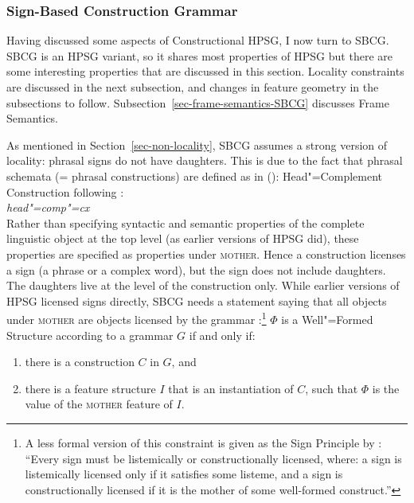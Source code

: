 \documentclass[output=paper,biblatex,babelshorthands,newtxmath,draftmode,colorlinks,citecolor=brown]{langscibook}
\begin{document}
\subsubsection{Sign-Based Construction Grammar}
\label{cxg:sec-sbcg}\label{sec-sbcg}

Having discussed some aspects of Constructional HPSG, I now turn to SBCG. SBCG is an HPSG variant,
so it shares most properties of HPSG but there are some interesting properties that are discussed in
this section. Locality constraints are discussed in the next subsection, and changes in feature geometry
in the subsections to follow. Subsection~\ref{sec-frame-semantics-SBCG} discusses Frame Semantics.

\label{sec-locality}

As mentioned in Section~\ref{sec-non-locality}, SBCG assumes a strong version of locality: phrasal
signs do not have daughters. This is due to the fact that phrasal schemata (= phrasal constructions)
are defined as in ():
\eas
Head"=Complement Construction following \citet[481]{SWB2003a}:\\
\emph{head"=comp"=cx} \impl\\
\zs
Rather than specifying syntactic and semantic properties of the complete linguistic object at the
top level (as earlier versions of HPSG did), these properties are specified as properties under \textsc{mother}. Hence a construction
licenses a sign (a phrase or a complex word), but the sign does not include daughters. The daughters live at the level of the
construction only. While earlier versions of HPSG licensed signs directly, SBCG needs a statement
saying that all objects under \textsc{mother} are objects licensed by the grammar \citep*[]{SWB2003a}:\footnote{%
A less formal version of this constraint is given as the Sign Principle by
\citet[]{Sag2012a}: ``Every sign must be listemically or constructionally licensed, where: a
sign is listemically licensed only if it satisfies some listeme, and a sign is constructionally
licensed if it is the mother of some well-formed construct.''
}
\ea
\label{meta-construction-statemnet}
$\Phi$ is a Well"=Formed Structure according to a grammar $G$ if and only if:
\begin{enumerate}
\item there is a construction $C$ in $G$, and
\item there is a feature structure $I$ that is an instantiation of $C$, such that
      $\Phi$ is the value of the \textsc{mother} feature of $I$.
\end{enumerate}
\end{document}
